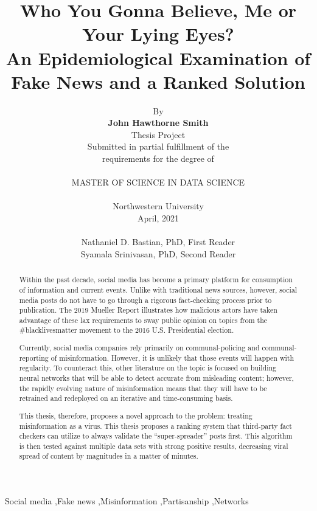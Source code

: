 \documentclass[preprint,review,12pt]{elsarticle}
\begin{document}
\begin{frontmatter}


\title{Who You Gonna Believe, Me or Your Lying Eyes?\\
An Epidemiological Examination of Fake News and a Ranked Solution}

\author{By \\\textbf{John Hawthorne Smith} \\Thesis Project \\Submitted in partial fulfillment of the \\requirements for the degree of \\ \\MASTER OF SCIENCE IN DATA SCIENCE \\ \\Northwestern University \\April, 2021 \\ \\Nathaniel D. Bastian, PhD, First Reader \\Syamala Srinivasan, PhD, Second Reader}




\begin{abstract}
Within the past decade, social media has become a primary platform for consumption of information and current events. Unlike with traditional news sources, however, social media posts do not have to go through a rigorous fact-checking process prior to publication. The 2019 Mueller Report illustrates how malicious actors have taken advantage of these lax requirements to sway public opinion on topics from the \#blacklivesmatter movement to the 2016 U.S. Presidential election. 

Currently, social media companies rely primarily on communal-policing and communal-reporting of misinformation. However, it is unlikely that those events will happen with regularity. To counteract this, other literature on the topic is focused on building neural networks that will be able to detect accurate from misleading content; however, the rapidly evolving nature of misinformation means that they will have to be retrained and redeployed on an iterative and time-consuming basis.

This thesis, therefore, proposes a novel approach to the problem: treating misinformation as a virus. This thesis proposes a ranking system that third-party fact checkers can utilize to always validate the ``super-spreader” posts first. This algorithm is then tested against multiple data sets with strong positive results, decreasing viral spread of content by magnitudes in a matter of minutes.

\end{abstract}

\begin{keyword}
Social media \sep Fake news \sep Misinformation \sep Partisanship \sep Networks
\end{keyword}

\end{frontmatter}
\end{document}
